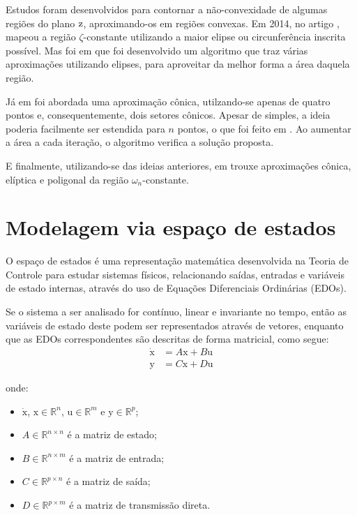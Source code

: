 Estudos foram desenvolvidos para contornar a não-convexidade de algumas regiões do plano $\operatorname{\mathrm{z}}$, aproximando-os em regiões convexas. Em 2014, no artigo ,  mapeou a região $\zeta$-constante utilizando a maior elipse ou circunferência inscrita possível. Mas foi em \cite{ROSINOVA2019} que foi desenvolvido um algoritmo que traz várias aproximações utilizando elipses, para aproveitar da melhor forma a área daquela região.

Já em  foi abordada uma aproximação cônica, utilzando-se apenas de quatro pontos e, consequentemente, dois setores cônicos. Apesar de simples, a ideia poderia facilmente ser estendida para $n$ pontos, o que foi feito em \cite{WISNIEWSKI2019}. Ao aumentar a área a cada iteração, o algoritmo verifica a solução proposta.

E finalmente, utilizando-se das ideias anteriores,  em  trouxe aproximações cônica, elíptica e poligonal da região $\omega_n$-constante.

\section{Modelagem via espaço de estados}
O espaço de estados é uma representação matemática desenvolvida na Teoria de Controle para estudar sistemas físicos, relacionando saídas, entradas e variáveis de estado internas, através do uso de Equações Diferenciais Ordinárias (EDOs).

Se o sistema a ser analisado for contínuo, linear e invariante no tempo, então as variáveis de estado deste podem ser representados através de vetores, enquanto que as EDOs correspondentes são descritas de forma matricial, como segue:
\begin{subequations}
  \label{eq:SSC}
  \begin{align}
    \dot{\pmb{\mathrm{x}}} &= A\pmb{\mathrm{x}} + B\pmb{\mathrm{u}}\label{eq:SSCEntrada}\\
    \pmb{\mathrm{y}} &= C\pmb{\mathrm{x}} + D\pmb{\mathrm{u}}\label{eq:SSCSaida}
  \end{align}
\end{subequations}

\noindent onde:

\begin{itemize}
  \item $\dot{\pmb{\mathrm{x}}}$, $\pmb{\mathrm{x}} \in \mathbb{R}^n$, $\pmb{\mathrm{u}} \in \mathbb{R}^m$ e $\pmb{\mathrm{y}} \in \mathbb{R}^p$;
  \item $A \in \mathbb{R}^{n \times n}$ é a matriz de estado;
  \item $B \in \mathbb{R}^{n \times m}$ é a matriz de entrada;
  \item $C \in \mathbb{R}^{p \times n}$ é a matriz de saída;
  \item $D \in \mathbb{R}^{p \times m}$ é a matriz de transmissão direta.
\end{itemize}

